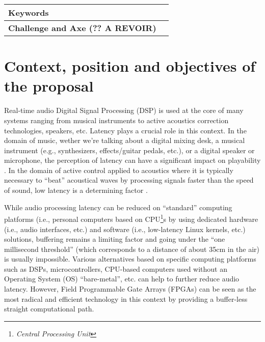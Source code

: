 \documentclass[a4paper,10pt]{article}
\author{Coordinateur: Romain Michon\\
\small GRAME-CNCM, Lyon.
}
\title{\vspace{-\baselineskip}\mytitle}
\date{Domaine transversaux\\
Axe 8.6 - Révolution numérique : rapports au savoir et à la culture}
\begin{document}
\maketitle
\thispagestyle{fancy}



\begin{tabular}{p{2.3cm} p{12cm}}
  \hline
  \textbf{Keywords} &   \\\hline
  \textbf{Challenge and Axe (?? A REVOIR)} & 
  \\\hline
\end{tabular}


\section{Context, position and objectives of the proposal}

Real-time audio Digital Signal Processing (DSP) is used at the core of many systems ranging from musical instruments to active acoustics correction technologies, speakers, etc. Latency plays a crucial role in this context.  In the domain of music, wether we're talking about a digital mixing desk, a musical instrument (e.g., synthesizers, effects/guitar pedals, etc.), or a digital speaker or microphone, the perception of latency can have a significant impact on playability \cite{Lago2004}. In the domain of active control applied to acoustics where it is typically necessary to ``beat'' acoustical waves by processing signals faster than the speed of sound, low latency is a determining factor \cite{TODO}.  

While audio processing latency can be reduced on ``standard'' computing platforms (i.e., personal computers based on CPU\footnote{\textit{Central Processing Unit}}s by using dedicated hardware (i.e., audio interfaces, etc.) and software (i.e., low-latency Linux kernels, etc.) solutions, buffering remains a limiting factor and going under the ``one millisecond threshold'' (which corresponds to a distance of about 35cm in the air) is usually impossible. Various alternatives based on specific computing platforms such as DSPs, microcontrollers, CPU-based computers used without an Operating System (OS) ``bare-metal'', etc. can help to further reduce audio latency. However, Field Programmable Gate Arrays (FPGAs) can be seen as the most radical and efficient technology in this context by providing a buffer-less straight computational path. 
\end{document}
